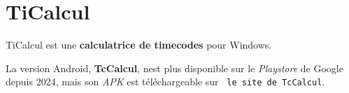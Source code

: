 \chapter{Ti\+Calcul}
\label{md_readme}
\label{md_readme_autotoc_md0}%
 Ti\+Calcul est une {\bfseries{calculatrice de timecodes}} pour Windows. ~\newline




La version Android, {\bfseries{Tc\+Calcul}}, n\textquotesingle{}est plus disponible sur le {\itshape Playstore} de Google depuis 2024, mais son {\itshape APK} est téléchargeable sur {\texttt{ le site de Tc\+Calcul}}. 